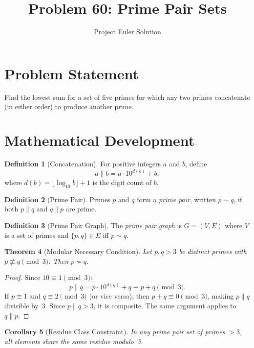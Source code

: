 \documentclass[12pt,a4paper]{article}
\title{Problem 60: Prime Pair Sets}
\author{Project Euler Solution}
\date{}
\newtheorem{theorem}{Theorem}
\newtheorem{corollary}[theorem]{Corollary}
\theoremstyle{definition}
\newtheorem{definition}[theorem]{Definition}
\theoremstyle{remark}
\begin{document}
\maketitle

\section{Problem Statement}
Find the lowest sum for a set of five primes for which any two primes concatenate (in either order) to produce another prime.

\section{Mathematical Development}

\begin{definition}[Concatenation]
For positive integers $a$ and $b$, define
\[
a \| b = a \cdot 10^{d(b)} + b,
\]
where $d(b) = \lfloor \log_{10} b \rfloor + 1$ is the digit count of $b$.
\end{definition}

\begin{definition}[Prime Pair]
Primes $p$ and $q$ form a \emph{prime pair}, written $p \sim q$, if both $p \| q$ and $q \| p$ are prime.
\end{definition}

\begin{definition}[Prime Pair Graph]
The \emph{prime pair graph} is $G = (V, E)$ where $V$ is a set of primes and $\{p, q\} \in E$ iff $p \sim q$.
\end{definition}

\begin{theorem}[Modular Necessary Condition]
\label{thm:mod3}
Let $p, q > 3$ be distinct primes with $p \not\equiv q \pmod{3}$. Then $p \not\sim q$.
\end{theorem}

\begin{proof}
Since $10 \equiv 1 \pmod{3}$:
\[
p \| q = p \cdot 10^{d(q)} + q \equiv p + q \pmod{3}.
\]
If $p \equiv 1$ and $q \equiv 2 \pmod{3}$ (or vice versa), then $p + q \equiv 0 \pmod{3}$, making $p \| q$ divisible by~3. Since $p \| q > 3$, it is composite. The same argument applies to $q \| p$.
\end{proof}

\begin{corollary}[Residue Class Constraint]
In any prime pair set of primes $> 3$, all elements share the same residue modulo~3.
\end{corollary}
\end{document}
